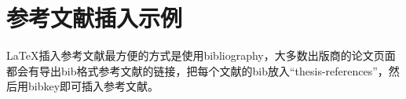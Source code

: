 \section{参考文献插入示例}

LaTeX\supercite{lamport1994latex}插入参考文献最方便的方式是使用bibliography\supercite{pritchard1969statistical}，大多数出版商的论文页面\supercite{lamport1994latex,pritchard1969statistical}都会有导出bib格式参考文献的链接，把每个文献的bib放入``thesis-references''，然后用bibkey即可插入参考文献。

\lipsum

\newpage